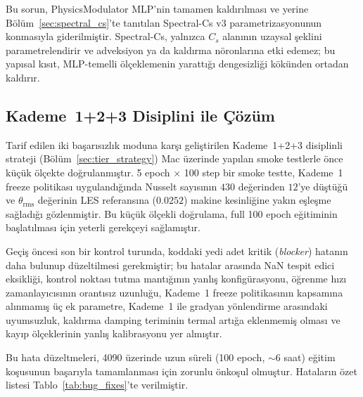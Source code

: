 Bu sorun, PhysicsModulator MLP'nin tamamen kaldırılması ve yerine Bölüm~\ref{sec:spectral_cs}'te tanıtılan Spectral-Cs v3 parametrizasyonunun konmasıyla giderilmiştir. Spectral-Cs, yalnızca $C_{s}$ alanının uzaysal şeklini parametrelendirir ve adveksiyon ya da kaldırma nöronlarına etki edemez; bu yapısal kısıt, MLP-temelli ölçeklemenin yarattığı dengesizliği kökünden ortadan kaldırır.

\subsection{Kademe~1+2+3 Disiplini ile Çözüm}

Tarif edilen iki başarısızlık moduna karşı geliştirilen Kademe~1+2+3 disiplinli strateji (Bölüm~\ref{sec:tier_strategy}) Mac üzerinde yapılan smoke testlerle önce küçük ölçekte doğrulanmıştır. 5 epoch $\times$ 100 step bir smoke testte, Kademe~1 freeze politikası uygulandığında Nusselt sayısının $430$ değerinden $12$'ye düştüğü ve $\theta_{\mathrm{rms}}$ değerinin LES referansına ($0.0252$) makine kesinliğine yakın eşleşme sağladığı gözlenmiştir. Bu küçük ölçekli doğrulama, full 100 epoch eğitiminin başlatılması için yeterli gerekçeyi sağlamıştır.

Geçiş öncesi son bir kontrol turunda, koddaki yedi adet kritik (\textit{blocker}) hatanın daha bulunup düzeltilmesi gerekmiştir; bu hatalar arasında NaN tespit edici eksikliği, kontrol noktası tutma mantığının yanlış konfigürasyonu, öğrenme hızı zamanlayıcısının orantısız uzunluğu, Kademe~1 freeze politikasının kapsamına alınmamış üç ek parametre, Kademe~1 ile gradyan yönlendirme arasındaki uyumsuzluk, kaldırma damping teriminin termal artığa eklenmemiş olması ve kayıp ölçeklerinin yanlış kalibrasyonu yer almıştır.

Bu hata düzeltmeleri, 4090 üzerinde uzun süreli (100 epoch, $\sim$6 saat) eğitim koşusunun başarıyla tamamlanması için zorunlu önkoşul olmuştur. Hataların özet listesi Tablo~\ref{tab:bug_fixes}'te verilmiştir.


